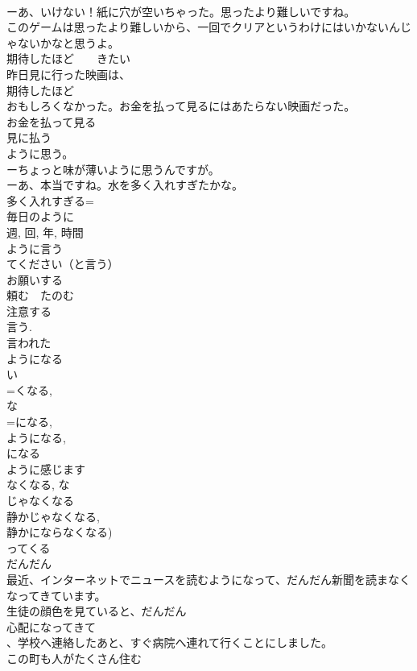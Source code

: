 \documentclass[8pt]{extreport}
\begin{document}
\begin{CJK}{UTF8}{min}
\\	ーあ、いけない！紙に穴が空いちゃった。思ったより難しいですね。
\\	このゲームは思ったより難しいから、一回でクリアというわけにはいかないんじゃないかなと思うよ。
\\	期待したほど　　きたい
\\	昨日見に行った映画は、
\\	期待したほど
\\	おもしろくなかった。お金を払って見るにはあたらない映画だった。
\\	お金を払って見る
\\	見に払う
\\	ように思う。
\\	ーちょっと味が薄いように思うんですが。
\\	ーあ、本当ですね。水を多く入れすぎたかな。
\\	多く入れすぎる=
\\	毎日のように
\\	週, 回, 年, 時間
\\	ように言う
\\	てください（と言う）　
\\	お願いする
\\	頼む　たのむ 
\\	注意する 
\\	言う.
\\	言われた　
\\	ようになる
\\	い
\\	=くなる,
\\	な
\\	=になる, 
\\	ようになる, 
\\	になる
\\	ように感じます　
\\	なくなる, な
\\	じゃなくなる 
\\	静かじゃなくなる, 
\\	静かにならなくなる)
\\	ってくる 
\\	だんだん 
\\	最近、インターネットでニュースを読むようになって、だんだん新聞を読まなくなってきています。
\\	生徒の顔色を見ていると、だんだん
\\	心配になってきて
\\	、学校へ連絡したあと、すぐ病院へ連れて行くことにしました。　
\\	この町も人がたくさん住む

\end{CJK}
\end{document}
